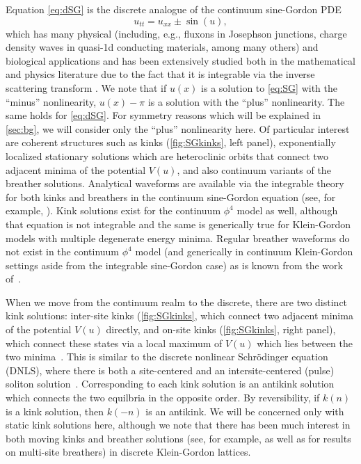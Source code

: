 \documentclass[12pt,reqno]{amsart}
\begin{document}
Equation \cref{eq:dSG} is the discrete analogue of the 
continuum sine-Gordon PDE
\begin{equation}\label{eq:SG}
	u_{tt} = u_{xx} \pm \sin(u),
\end{equation}
which has many physical (including, e.g.,
fluxons in Josephson junctions, charge density
waves in quasi-1d conducting materials, among many others)
and biological applications \cites{SGbook,Ivancevic2013} and has been extensively studied both in the mathematical and physics literature due to the fact that it is integrable via the inverse scattering transform \cite{SolitonBook1}. 
We note that if $u(x)$ is a solution to \cref{eq:SG} with the ``minus'' nonlinearity, $u(x) - \pi$ is a solution with the ``plus'' nonlinearity. The same holds for \cref{eq:dSG}. For symmetry reasons which will be explained in \cref{sec:bg}, we will consider only the {``plus''} nonlinearity here.
Of particular interest are coherent structures such as kinks (\cref{fig:SGkinks}, left panel), exponentially localized stationary solutions which 
are heteroclinic orbits that connect two adjacent minima of the potential $V(u)$, and also continuum variants of the breather
solutions. Analytical waveforms are available via the 
integrable theory for both kinks and breathers in the continuum sine-Gordon equation (see, for example, \cite{SGchapter}). Kink  solutions exist for the continuum $\phi^4$ model as well, although that equation is not integrable \cites{SGbook,KevrekidisWeinstein2000}
and the same is generically true for Klein-Gordon
models
with multiple degenerate energy minima.
Regular breather waveforms do not exist
in the continuum $\phi^4$ model (and generically in continuum
Klein-Gordon settings aside from the integrable
sine-Gordon case) as is known from the work of~\cite{segur}. 

When we move from the continuum realm to the discrete, there are two distinct kink solutions: inter-site kinks (\cref{fig:SGkinks}, which connect two adjacent minima of the potential $V(u)$ directly, and on-site kinks (\cref{fig:SGkinks}, right panel), which connect these states via a local maximum of $V(u)$ which lies between the two minima~\cite{peyrard}. 
This is similar to the discrete nonlinear Schr{\"o}dinger equation (DNLS), where there is both a site-centered and an intersite-centered (pulse) soliton solution~\cite{Kevrekidis2009}. Corresponding to each kink solution is an antikink solution which connects the two equilbria in the opposite order. By reversibility, if $k(n)$ is a kink solution, then $k(-n)$ is an antikink. We will be concerned only with static kink solutions here, although we note that there has been much interest in both moving kinks \cites{Aigner2003,Iooss2006,Cisneros2008} and breather solutions (see, for example, \cites{SGbook} as well as \cites{Pelinovsky2012,Cuevas2011} for results on multi-site breathers) in discrete Klein-Gordon lattices.
\end{document}
